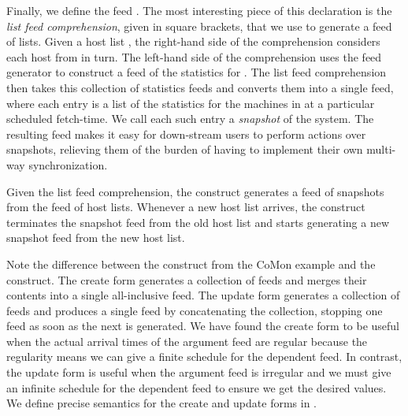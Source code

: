 Finally, we define the feed .  The most interesting piece
of this declaration is the {\em list feed comprehension}, given in
square brackets, that we use to generate a feed of lists. 
Given a host list , the right-hand side of the comprehension
considers each host  from  in turn.  The left-hand side of
the comprehension uses the  feed generator to construct
a feed of the statistics for .  The list feed comprehension then
takes this collection of statistics feeds and converts them into a
single feed, where each entry is a list of the statistics for
the machines in  at a particular scheduled fetch-time.  
We call each such entry a \textit{snapshot} of the system.
The resulting feed makes it easy for down-stream users to perform
actions over snapshots, relieving them of the burden of having to
implement their own multi-way synchronization.

Given the list feed comprehension, the  construct
generates a feed of snapshots from the feed of host lists.  Whenever a
new host list arrives, the  construct
terminates the snapshot feed from the old host list and starts
generating a new snapshot feed from the new host list.  

Note the difference between the  construct 
from the CoMon example and the  construct.  The
create form generates a collection of feeds and merges their
contents into a single all-inclusive feed.  The update form
generates a collection of feeds and produces a single feed by
concatenating the collection, stopping one feed as soon as the next is
generated. 
We have found the create form to be useful when the actual arrival
times of the argument feed are regular because the regularity means we
can give a finite schedule for the dependent feed.  In contrast, the
update form is useful when the argument feed is irregular and we must
give an infinite schedule for the dependent feed to ensure we get the
desired values.  We define precise semantics for the create and update
forms in .



